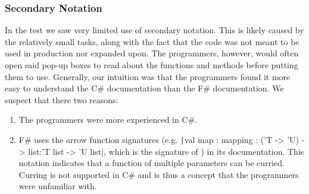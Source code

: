 \subsubsection{Secondary Notation}
In the test we saw very limited use of secondary notation. This is likely caused by the relatively small tasks, along with the fact that the code was not meant to be used in production nor expanded upon. The programmers, however, would often open said pop-up boxes to read about the functions and methods before putting them to use. Generally, our intuition was that the programmers found it more easy to understand the C\# documentation than the F\# documentation. We suspect that there two reasons:
\begin{enumerate}
    \item The programmers were more experienced in C\#.
    \item F\# uses the arrow function signatures (e.g. \texttt|val map : mapping : ('T -> 'U) -> list:'T list -> 'U list|, which is the signature of ) in its documentation. This notation indicates that a function of multiple parameters can be curried. Curring is not supported in C\# and is thus a concept that the programmers were unfamiliar with.
\end{enumerate}